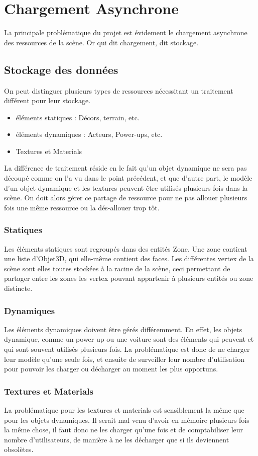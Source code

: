 \documentclass{report}
\begin{document}
		\newpage			

		\section{Chargement Asynchrone}
			La principale problématique du projet est évidement le chargement asynchrone des ressources de la scène. Or qui dit chargement, dit stockage. 
			\subsection{Stockage des données}
			On peut distinguer plusieurs types de ressources nécessitant un traitement différent pour leur stockage.
			\begin{itemize}
				\item éléments statiques : Décors, terrain, etc.
				\item éléments dynamiques : Acteurs, Power-ups, etc.
				\item Textures et Materials
			\end{itemize}
			La différence de traitement réside en le fait qu'un objet dynamique ne sera pas découpé comme on l'a vu dans le point précédent, et que d'autre part, le modèle d'un objet dynamique et les textures peuvent être utilisés plusieurs fois dans la scène. On doit alors gérer ce partage de ressource pour ne pas allouer plusieurs fois une même ressource ou la dés-allouer trop tôt.
			\subsubsection{Statiques}
				Les éléments statiques sont regroupés dans des entités Zone. Une zone contient une liste d'Objet3D, qui elle-même contient des faces. Les différentes vertex de la scène sont elles toutes stockées à la racine de la scène, ceci permettant de partager entre les zones les vertex pouvant appartenir à plusieurs entités ou zone distincte.
			\subsubsection{Dynamiques}
				Les éléments dynamiques doivent être gérés différemment. En effet, les objets dynamique, comme un power-up ou une voiture	 sont des éléments qui peuvent et qui sont souvent utilisés plusieurs fois. La problématique est donc de ne charger leur modèle qu'une seule fois, et ensuite de surveiller leur nombre d'utilisation pour pouvoir les charger ou décharger au moment les plus opportuns.
			\subsubsection{Textures et Materials}
			La problématique pour les textures et materials est sensiblement la même que pour les objets dynamiques. Il serait mal venu d'avoir en mémoire plusieurs fois la même chose, il faut donc ne les charger qu'une fois et de comptabiliser leur nombre d'utilisateurs, de manière à ne les décharger que si ils deviennent obsolètes.
\end{document}
